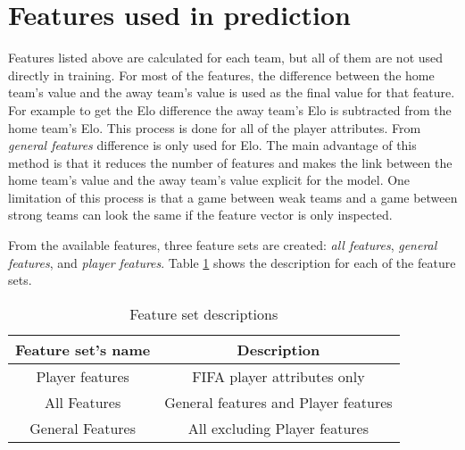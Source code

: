 \section{Features used in prediction}
Features listed above are calculated for each team, but all of them are not used directly in training. For most of the features, the difference between the home team's value and the away team's value is used as the final value for that feature. For example to get the Elo difference the away team's Elo is subtracted from the home team's Elo. This process is done for all of the player attributes. From \textit{general features} difference is only used for Elo. The main advantage of this method is that it reduces the number of features and makes the link between the home team's value and the away team's value explicit for the model. One limitation of this process is that a game between weak teams and a game between strong teams can look the same if the feature vector is only inspected.

From the available features, three feature sets are created: \textit{all features}, \textit{general features}, and \textit{player features}. Table \ref{table:featuresetlist} shows the description for each of the feature sets.

\begin{table}
    \caption{Feature set descriptions}
    \begin{tabular}{| c | c|}
        \hline
        Feature set's name & Description \\
        \hline
        Player features & FIFA player attributes only \\
        All Features & General features and Player features \\
        General Features & All excluding Player features \\
        \hline
    \end{tabular}
    \label{table:featuresetlist}
\end{table}